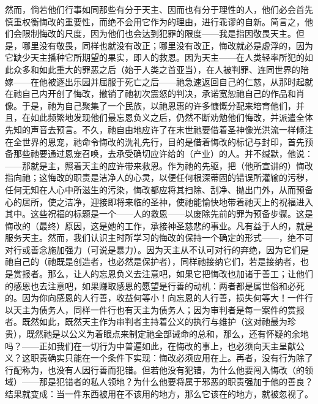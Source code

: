 然而，倘若他们行事如同那些有分于天主、因而也有分于理性的人，他们必会首先慎重权衡悔改的重要性，而绝不会用它作为的理由，进行乖谬的自新。简言之，他们会限制悔改的尺度，因为他们也会达到犯罪的限度——我是指因敬畏天主。但是，哪里没有敬畏，同样也就没有改正；哪里没有改正，悔改就必是虚浮的，因为它缺少天主播种它所期望的果实，即人的救恩。因为天主——在人类轻率所犯的如此众多和如此重大的罪恶之后（始于人类之首亚当），在人被判罪、连同世界的陪嫁——在他被逐出乐园并屈服于死亡之后——祂急速返回自己的仁慈，从那时起就在祂自己内开创了悔改，撤销了祂初次震怒的判决，承诺宽恕祂自己的作品和肖像。于是，祂为自己聚集了一个民族，以祂恩惠的许多慷慨分配来培育他们，并且，在如此频繁地发现他们最忘恩负义之后，仍然不断劝勉他们悔改，并派遣全体先知的声音去预言。不久，祂自由地应许了在末世祂要借着圣神像光洪流一样倾注在全世界的恩宠，祂命令悔改的洗礼先行，目的是借着悔改的标记与封印，首先预备那些祂要通过恩宠召唤，去承受确切应许给的（产业）的人。并不缄默，他说：——那就是主，照着天主的应许带来救恩。作为祂的先驱，把（他所宣讲的）悔改指向祂；这悔改的职责是洁净人的心灵，以便任何根深蒂固的错误所灌输的污秽，任何无知在人心中所滋生的污染，悔改都应将其扫除、刮净、抛出门外，从而预备心的居所，使之洁净，迎接即将来临的圣神，使祂能愉快地带着祂天上的祝福进入其中。这些祝福的标题是一个——人的救恩——以废除先前的罪为预备步骤。这是悔改的（最终）原因，这是她的工作，承接神圣慈悲的事业。凡有益于人的，就是服务天主。然而，我们认识主时所学习的悔改的保持一个确定的形式——，绝不可对行或善念施加强力（可说是暴力）。因为天主从不认可对行的弃绝，因为它们是祂自己的（祂既是创造者，也必然是保护者），同样祂接纳它们，若是接纳者，也是赏报者。那么，让人的忘恩负义去注意吧，如果它把悔改也加诸于善工；让他们的感恩也去注意吧，如果赚取感恩的愿望是行善的动机：两者都是属世俗和必死的。因为你向感恩的人行善，收益何等小！向忘恩的人行善，损失何等大！一件行以天主为债务人，同样一件行也有天主为债务人；因为审判者是每一案件的赏报者。既然如此，既然天主作为审判者主持着公义的执行与维护（这对祂最为珍贵），既然祂是以公义为着眼点来制定祂全部诫命的总和，那么，还有怀疑的余地吗？——正如我们在一切行为中普遍如此，在悔改的事上，也必须向天主呈献公义？这职责确实只能在一个条件下实现：悔改必须应用在上。再者，没有行为除了行配称为，也没有人因行善而犯错。但若他没有犯错，为什么他要闯入悔改（的领域）——那是犯错者的私人领地？为什么他要将属于邪恶的职责强加于他的善良？结果就变成：当一件东西被用在不该用的地方，那么它该在的地方，就被忽视了。\par


